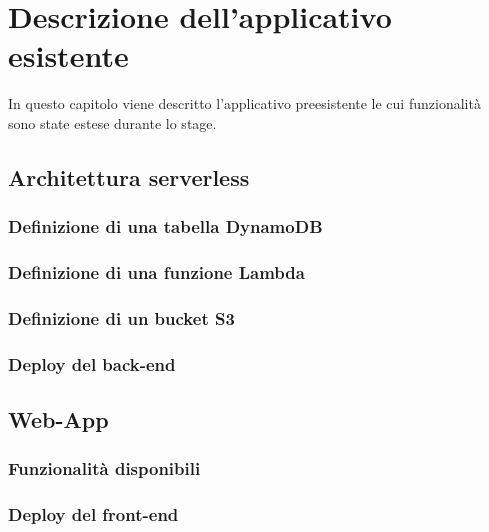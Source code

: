 
\chapter{Descrizione dell'applicativo esistente}
\label{cap:applicazione}

In questo capitolo viene descritto l'applicativo preesistente le cui funzionalità sono state estese durante lo stage.\\

\section{Architettura serverless}
	\subsection{Definizione di una tabella DynamoDB}
	\subsection{Definizione di una funzione Lambda}
	\subsection{Definizione di un bucket S3}
	\subsection{Deploy del back-end}

\section{Web-App}
	\subsection{Funzionalità disponibili}
	\subsection{Deploy del front-end}